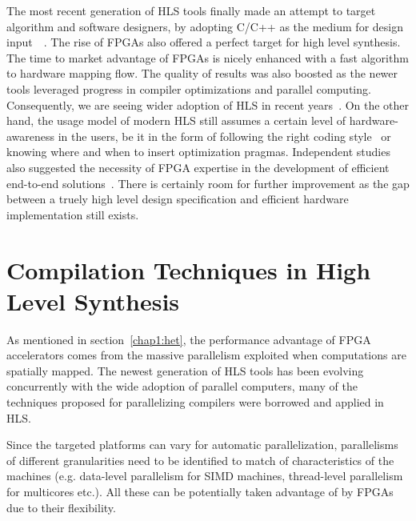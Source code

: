 The most recent generation of HLS tools finally made an attempt to target algorithm and software designers, by adopting
C/C++ as the medium for design input~~\cite{c2silicon:cadence}\cite{forte:cynthesizer}\cite{1033026}. The rise of FPGAs also offered 
a perfect target for high level synthesis. The time to market advantage of FPGAs is nicely enhanced with a fast algorithm to hardware
mapping flow. The quality of results was also boosted as the newer tools leveraged progress in compiler optimizations and parallel computing.
Consequently, we are seeing wider adoption of HLS in recent years~\cite{5209959}. 
On the other hand, the usage model of modern HLS still assumes a certain level of hardware-awareness in the users, 
be it in the form of following the right coding style~\cite{Stitt:2006:CRM:1233501.1233649} or knowing where and when to insert optimization pragmas. 
Independent studies also suggested the necessity of FPGA expertise in the development of 
efficient end-to-end solutions~\cite{Liang:2012:HSP:2215536.2215537}\cite{7082747}. 
There is certainly room for further improvement as the gap between a truely high level design specification and efficient
hardware implementation still exists. 

\section{Compilation Techniques in High Level Synthesis}
\label{relevantTech}
As mentioned in section~\ref{chap1:het}, the performance advantage of FPGA accelerators comes from the massive
parallelism exploited when computations are spatially mapped. The newest generation of HLS tools has been evolving
concurrently with the wide adoption of parallel computers, many of the techniques proposed for parallelizing compilers
were borrowed and applied in HLS.

Since the targeted platforms can vary for automatic parallelization, parallelisms of different granularities need to be
identified to match of characteristics of the machines (e.g. data-level parallelism for SIMD machines, thread-level
parallelism for multicores etc.). All these can be potentially taken advantage of by FPGAs due to their flexibility.

